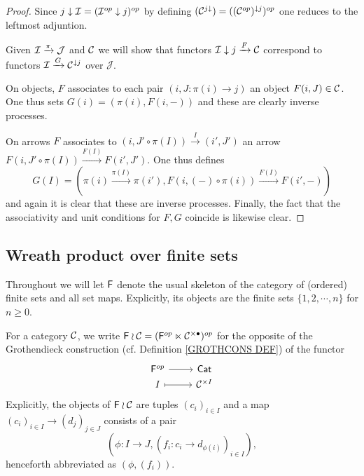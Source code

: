 \documentclass[a4paper,10pt]{article}%
\begin{document}
\begin{proof}
Since $j \downarrow \mathcal{I} = (\mathcal{I}^{op} \downarrow j)^{op}$ by  defining $(\mathcal{C}^{j \downarrow}) = ((\mathcal{C}^{op})^{\downarrow j})^{op}$ one reduces to the leftmost adjuntion.

	Given $\mathcal{I} \xrightarrow{\pi} \mathcal{J}$ and $\mathcal{C}$ we will show that functors 
	$\mathcal{I} \downarrow j \xrightarrow{F} \mathcal{C}$
correspond to functors
	$\mathcal{I} \xrightarrow{G} \mathcal{C}^{\downarrow j}$ over $\mathcal{J}$.
	
	On objects, $F$ associates to each pair 
	$(i,J\colon \pi(i) \to j)$ an object $F(i,J)\in \mathcal{C}$. One thus sets $G(i)=(\pi(i), F(i,\minus))$ and these are clearly inverse processes.

	On arrows $F$ associates to 
	$(i,J' \circ \pi(I)) \xrightarrow{I} (i',J')$ an arrow
	$F(i,J' \circ \pi(I)) \xrightarrow{F(I)} F(i',J')$.
	One thus defines
\[
	G(I) = \left(
	\pi(i) \xrightarrow{\pi(I)} \pi(i'),
	F\left(i,(\minus)\circ \pi(i)\right)
		\xrightarrow{F(I)}
	F\left(i',\minus \right)
	\right)
\]
and again it is clear that these are inverse processes.
	Finally, the fact that the associativity and unit conditions for $F,G$ coincide is likewise clear.
\end{proof}


\subsection{Wreath product over finite sets}

Throughout we will let $\mathsf{F}$ denote the usual skeleton of the category of (ordered) finite sets and all set maps. Explicitly, its objects are the finite sets $\{1,2,\cdots,n\}$ for $n\geq 0$.


\begin{definition}
	For a category $\mathcal{C}$, we write 
	$\mathsf{F} \wr \mathcal{C} = (\mathsf{F}^{op} \ltimes \mathcal{C}^{\times \bullet})^{op}$ 
	for the opposite of the Grothendieck construction (cf. Definition \ref{GROTHCONS DEF}) of the functor
\[
\begin{tikzcd}[row sep=0pt]
	\Fin^{op} \ar{r} & \mathsf{Cat}
\\
	I \ar[r,mapsto] & \C^{\times I}
\end{tikzcd}	
 \]
Explicitly, the objects of $\mathsf{F} \wr \mathcal{C}$ are tuples $(c_i)_{i \in I}$ and a map 
$(c_i)_{i \in I} \to (d_j)_{j \in J}$ consists of a pair 
\[(\phi \colon I \to J, (f_i\colon c_i \to d_{\phi(i)})_{i\in I}),\]
 henceforth abbreviated as $(\phi,(f_i))$.
\end{definition}
 
\end{document}
